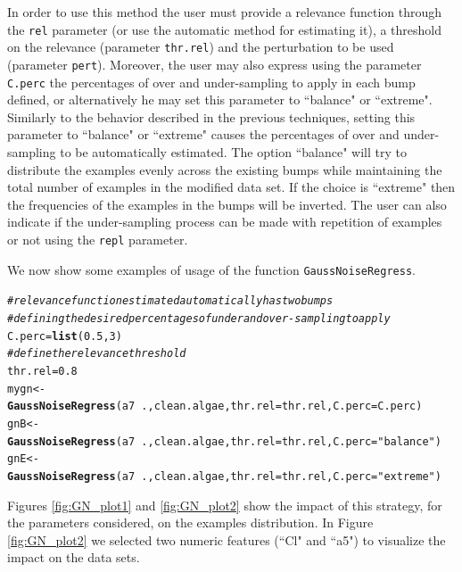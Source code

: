 \documentclass[10pt,a4paper]{article}\usepackage[]{graphicx}\usepackage[]{color}
\makeatletter
\newcommand{\hlnum}[1]{\textcolor[rgb]{0.686,0.059,0.569}{#1}}%
\newcommand{\hlstr}[1]{\textcolor[rgb]{0.192,0.494,0.8}{#1}}%
\newcommand{\hlcom}[1]{\textcolor[rgb]{0.678,0.584,0.686}{\textit{#1}}}%
\newcommand{\hlopt}[1]{\textcolor[rgb]{0,0,0}{#1}}%
\newcommand{\hlstd}[1]{\textcolor[rgb]{0.345,0.345,0.345}{#1}}%
\newcommand{\hlkwb}[1]{\textcolor[rgb]{0.69,0.353,0.396}{#1}}%
\newcommand{\hlkwc}[1]{\textcolor[rgb]{0.333,0.667,0.333}{#1}}%
\newcommand{\hlkwd}[1]{\textcolor[rgb]{0.737,0.353,0.396}{\textbf{#1}}}%
\newenvironment{kframe}{%
 \def\at@end@of@kframe{}%
 \ifinner\ifhmode%
  \def\at@end@of@kframe{\end{minipage}}%
  \begin{minipage}{\columnwidth}%
 \fi\fi%
 \def\FrameCommand##1{\hskip\@totalleftmargin \hskip-\fboxsep
 \colorbox{shadecolor}{##1}\hskip-\fboxsep
     \hskip-\linewidth \hskip-\@totalleftmargin \hskip\columnwidth}%
 \MakeFramed {\advance\hsize-\width
   \@totalleftmargin\z@ \linewidth\hsize
   \@setminipage}}%
 {\par\unskip\endMakeFramed%
 \at@end@of@kframe}
\newenvironment{knitrout}{}{} %
\makeatother
\begin{document}
In order to use this method the user must provide a relevance function through the \texttt{rel} parameter (or use the automatic method for estimating it), a threshold on the relevance (parameter \texttt{thr.rel}) and the perturbation to be used (parameter \texttt{pert}). Moreover, the user may also express using the parameter \texttt{C.perc} the percentages of over and under-sampling to apply in each bump defined, or alternatively he may set this parameter to ``balance" or ``extreme". Similarly to the behavior described in the previous techniques, setting this parameter to ``balance" or ``extreme" causes the percentages of over and under-sampling to be automatically estimated. The option ``balance" will try to distribute the examples evenly across the existing bumps while maintaining the total number of examples in the modified data set. If the choice is ``extreme" then the frequencies of the examples in the bumps will be inverted. The user can also indicate if the under-sampling process can be made with repetition of examples or not using the \texttt{repl} parameter.

We now show some examples of usage of the function \texttt{GaussNoiseRegress}.
\begin{knitrout}\footnotesize
{}\color{fgcolor}\begin{kframe}
\begin{alltt}
\hlcom{# relevance function estimated automatically has two bumps}
\hlcom{# defining the desired percentages of under and over-sampling to apply}
\hlstd{C.perc}\hlkwb{=}\hlkwd{list}\hlstd{(}\hlnum{0.5}\hlstd{,} \hlnum{3}\hlstd{)}
\hlcom{# define the relevance threshold}
\hlstd{thr.rel}\hlkwb{=}\hlnum{0.8}
\hlstd{mygn} \hlkwb{<-} \hlkwd{GaussNoiseRegress}\hlstd{(a7}\hlopt{~}\hlstd{., clean.algae,} \hlkwc{thr.rel}\hlstd{=thr.rel,} \hlkwc{C.perc}\hlstd{=C.perc)}
\hlstd{gnB} \hlkwb{<-} \hlkwd{GaussNoiseRegress}\hlstd{(a7}\hlopt{~}\hlstd{., clean.algae,} \hlkwc{thr.rel}\hlstd{=thr.rel,} \hlkwc{C.perc}\hlstd{=}\hlstr{"balance"}\hlstd{)}
\hlstd{gnE} \hlkwb{<-} \hlkwd{GaussNoiseRegress}\hlstd{(a7}\hlopt{~}\hlstd{., clean.algae,} \hlkwc{thr.rel}\hlstd{=thr.rel,} \hlkwc{C.perc}\hlstd{=}\hlstr{"extreme"}\hlstd{)}
\end{alltt}
\end{kframe}
\end{knitrout}

Figures \ref{fig:GN_plot1} and \ref{fig:GN_plot2} show the impact of this strategy, for the parameters considered, on the examples distribution. In Figure \ref{fig:GN_plot2} we selected two numeric features (``Cl" and ``a5") to visualize the impact on the data sets.
\end{document}
